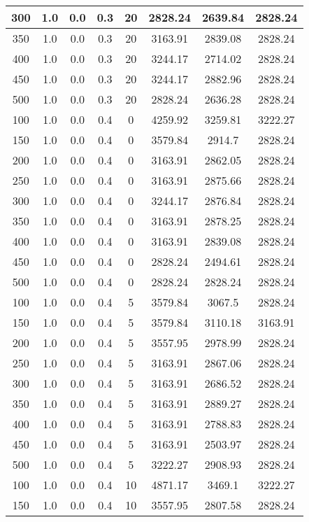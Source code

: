 \documentclass[a4paper, 12pt]{extreport}
\begin{document}
\begin{itemize}
\begin{longtable}{|c|c|c|c|c|c|c|c|}
			300 & 1.0 & 0.0 & 0.3 & 20 & 2828.24 & 2639.84 & 2828.24 \\\hline
			350 & 1.0 & 0.0 & 0.3 & 20 & 3163.91 & 2839.08 & 2828.24 \\\hline
			400 & 1.0 & 0.0 & 0.3 & 20 & 3244.17 & 2714.02 & 2828.24 \\\hline
			450 & 1.0 & 0.0 & 0.3 & 20 & 3244.17 & 2882.96 & 2828.24 \\\hline
			500 & 1.0 & 0.0 & 0.3 & 20 & 2828.24 & 2636.28 & 2828.24 \\\hline
			100 & 1.0 & 0.0 & 0.4 & 0 & 4259.92 & 3259.81 & 3222.27 \\\hline
			150 & 1.0 & 0.0 & 0.4 & 0 & 3579.84 & 2914.7 & 2828.24 \\\hline
			200 & 1.0 & 0.0 & 0.4 & 0 & 3163.91 & 2862.05 & 2828.24 \\\hline
			250 & 1.0 & 0.0 & 0.4 & 0 & 3163.91 & 2875.66 & 2828.24 \\\hline
			300 & 1.0 & 0.0 & 0.4 & 0 & 3244.17 & 2876.84 & 2828.24 \\\hline
			350 & 1.0 & 0.0 & 0.4 & 0 & 3163.91 & 2878.25 & 2828.24 \\\hline
			400 & 1.0 & 0.0 & 0.4 & 0 & 3163.91 & 2839.08 & 2828.24 \\\hline
			450 & 1.0 & 0.0 & 0.4 & 0 & 2828.24 & 2494.61 & 2828.24 \\\hline
			500 & 1.0 & 0.0 & 0.4 & 0 & 2828.24 & 2828.24 & 2828.24 \\\hline
			100 & 1.0 & 0.0 & 0.4 & 5 & 3579.84 & 3067.5 & 2828.24 \\\hline
			150 & 1.0 & 0.0 & 0.4 & 5 & 3579.84 & 3110.18 & 3163.91 \\\hline
			200 & 1.0 & 0.0 & 0.4 & 5 & 3557.95 & 2978.99 & 2828.24 \\\hline
			250 & 1.0 & 0.0 & 0.4 & 5 & 3163.91 & 2867.06 & 2828.24 \\\hline
			300 & 1.0 & 0.0 & 0.4 & 5 & 3163.91 & 2686.52 & 2828.24 \\\hline
			350 & 1.0 & 0.0 & 0.4 & 5 & 3163.91 & 2889.27 & 2828.24 \\\hline
			400 & 1.0 & 0.0 & 0.4 & 5 & 3163.91 & 2788.83 & 2828.24 \\\hline
			450 & 1.0 & 0.0 & 0.4 & 5 & 3163.91 & 2503.97 & 2828.24 \\\hline
			500 & 1.0 & 0.0 & 0.4 & 5 & 3222.27 & 2908.93 & 2828.24 \\\hline
			100 & 1.0 & 0.0 & 0.4 & 10 & 4871.17 & 3469.1 & 3222.27 \\\hline
			150 & 1.0 & 0.0 & 0.4 & 10 & 3557.95 & 2807.58 & 2828.24 \\\hline

\end{longtable}
\end{itemize}
\end{document}
